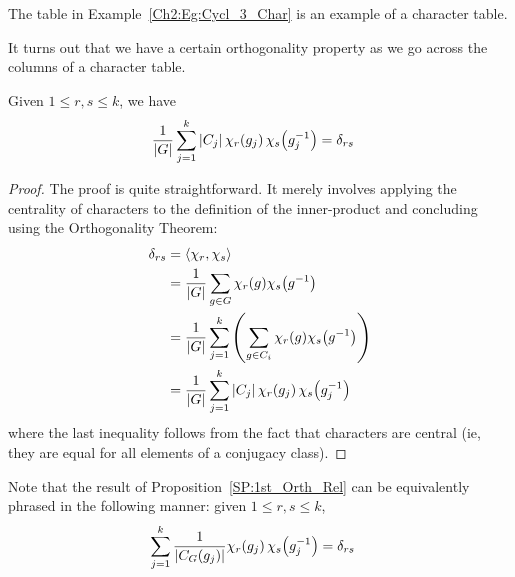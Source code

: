 The table in Example~\ref{Ch2:Eg:Cycl_3_Char} is an example of a character table.

It turns out that we have a certain orthogonality property as we go across the columns of a character table.

\begin{boxproposition}\label{SP:1st_Orth_Rel}
    Given $1 \leq r, s \leq k$, we have
    \begin{align*}
        \frac{1}{\left\lvert G \right\rvert} \sum_{j=1}^{k} \left\lvert C_j \right\rvert \chi_r\!\left( g_j \right) \chi_s\!\left( g_j^{-1} \right) &= \delta_{rs}
    \end{align*}
\end{boxproposition}
\begin{proof}
    The proof is quite straightforward. It merely involves applying the centrality of characters to the definition of the inner-product and concluding using the Orthogonality Theorem:
    \begin{align*}
        \delta_{rs} &=
        \left\langle \chi_r, \chi_s \right\rangle \\
        &= \frac{1}{\left\lvert G \right\rvert} \sum_{g \in G} \chi_r(g) \chi_s\!\left( g^{-1} \right) \\
        &= \frac{1}{\left\lvert G \right\rvert} \sum_{j=1}^{k} \left( \sum_{g \in C_i} \chi_r(g) \chi_s\!\left( g^{-1} \right) \right) \\
        &= \frac{1}{\left\lvert G \right\rvert} \sum_{j=1}^{k} \left\lvert C_j \right\rvert \chi_r\!\left( g_j \right) \chi_s\!\left( g_j^{-1} \right)
    \end{align*}
    where the last inequality follows from the fact that characters are central (ie, they are equal for all elements of a conjugacy class).
\end{proof}
\begin{remark}
    Note that the result of Proposition~\ref{SP:1st_Orth_Rel} can be equivalently phrased in the following manner: given $1 \leq r, s \leq k$,
    \begin{align}
        \sum_{j=1}^{k} \frac{1}{\left\lvert C_G(g_j) \right\rvert} \chi_r\!\left( g_j \right) \chi_s\!\left( g_j^{-1} \right) &= \delta_{rs}
        \label{SP:Eq:1st_Orth_Rel_Conj_Cl}
    \end{align}
\end{remark}

